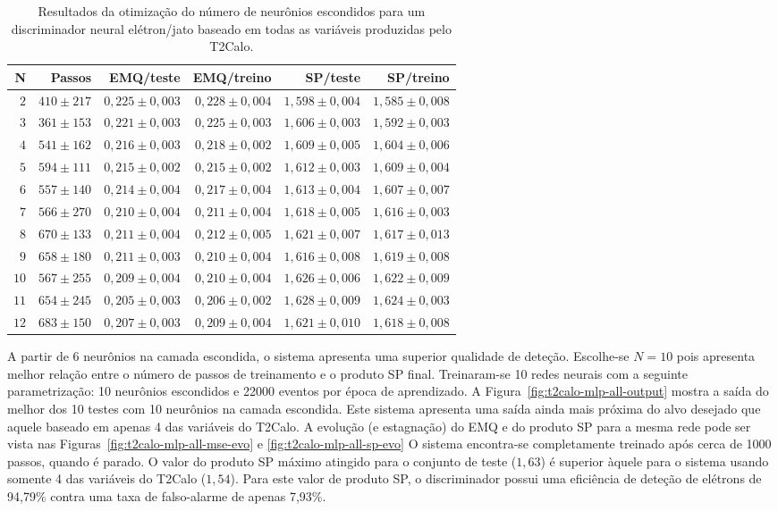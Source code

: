 \begin{table}
\caption{Resultados da otimização do número de neurônios escondidos para um
discriminador neural elétron/jato baseado em todas as variáveis produzidas
pelo T2Calo.}
\label{tab:t2calo-all-hidden-choice}
\begin{center}
\begin{tabular}{|r|r|r|r|r|r|} \hline
N & Passos & EMQ/teste & EMQ/treino & SP/teste & SP/treino \\ \hline 
$2$ & $410\pm217$ & $0,225\pm0,003$ & $0,228\pm0,004$ & $1,598\pm0,004$ & $1,585
\pm0,008$ \\
$3$ & $361\pm153$ & $0,221\pm0,003$ & $0,225\pm0,003$ & $1,606\pm0,003$ & $1,592
\pm0,003$ \\
$4$ & $541\pm162$ & $0,216\pm0,003$ & $0,218\pm0,002$ & $1,609\pm0,005$ & $1,604
\pm0,006$ \\
$5$ & $594\pm111$ & $0,215\pm0,002$ & $0,215\pm0,002$ & $1,612\pm0,003$ & $1,609
\pm0,004$ \\
$6$ & $557\pm140$ & $0,214\pm0,004$ & $0,217\pm0,004$ & $1,613\pm0,004$ & $1,607
\pm0,007$ \\
$7$ & $566\pm270$ & $0,210\pm0,004$ & $0,211\pm0,004$ & $1,618\pm0,005$ & $1,616
\pm0,003$ \\
$8$ & $670\pm133$ & $0,211\pm0,004$ & $0,212\pm0,005$ & $1,621\pm0,007$ & $1,617
\pm0,013$ \\
$9$ & $658\pm180$ & $0,211\pm0,003$ & $0,210\pm0,004$ & $1,616\pm0,008$ & $1,619
\pm0,008$ \\
$10$ & $567\pm255$ & $0,209\pm0,004$ & $0,210\pm0,004$ & $1,626\pm0,006$ & $1,62
2\pm0,009$ \\
$11$ & $654\pm245$ & $0,205\pm0,003$ & $0,206\pm0,002$ & $1,628\pm0,009$ & $1,62
4\pm0,003$ \\
$12$ & $683\pm150$ & $0,207\pm0,003$ & $0,209\pm0,004$ & $1,621\pm0,010$ & $1,61
8\pm0,008$ \\
\hline
\end{tabular}
\end{center}
\end{table}

A partir de 6 neurônios na camada escondida, o sistema apresenta uma superior
qualidade de deteção. Escolhe-se $N=10$ pois apresenta melhor relação entre o
número de passos de treinamento e o produto SP final. Treinaram-se 10 redes
neurais com a seguinte parametrização: 10 neurônios escondidos e 22000 eventos
por época de aprendizado. A Figura~\ref{fig:t2calo-mlp-all-output} mostra a
saída do melhor dos 10 testes com 10 neurônios na camada escondida. Este
sistema apresenta uma saída ainda mais próxima do alvo desejado que aquele
baseado em apenas 4 das variáveis do T2Calo. A evolução (e estagnação) do EMQ
e do produto SP para a mesma rede pode ser vista nas
Figuras~\ref{fig:t2calo-mlp-all-mse-evo} e \ref{fig:t2calo-mlp-all-sp-evo} O
sistema encontra-se completamente treinado após cerca de 1000 passos, quando é
parado. O valor do produto SP máximo atingido para o conjunto de teste
($1,63$) é superior àquele para o sistema usando somente 4 das variáveis do
T2Calo ($1,54$). Para este valor de produto SP, o discriminador possui uma
eficiência de deteção de elétrons de 94,79\% contra uma taxa de falso-alarme
de apenas 7,93\%.

